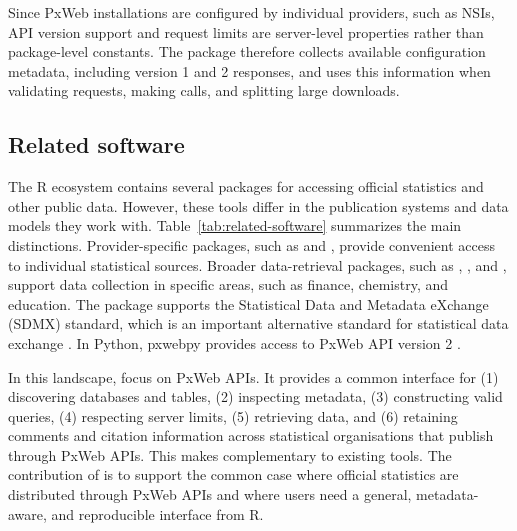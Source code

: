Since PxWeb installations are configured by individual providers, such as NSIs, API version support and request limits are server-level properties rather than package-level constants.
The  package therefore collects available configuration metadata, including version 1 and 2  responses, and uses this information when validating requests, making calls, and splitting large downloads.

\subsection{Related software}
\label{sec:related}

The R ecosystem contains several packages for accessing official statistics and other public data.
However, these tools differ in the publication systems and data models they work with.
Table~\ref{tab:related-software} summarizes the main distinctions.
Provider-specific packages, such as  \citep{Lahti17eurostat} and  \citep{WDI}, provide convenient access to individual statistical sources.
Broader data-retrieval packages, such as  \citep{pdfetch},  \citep{szocs2020webchem}, and  \citep{caro2017intsvy}, support data collection in specific areas, such as finance, chemistry, and education.
The  package supports the Statistical Data and Metadata eXchange (SDMX) standard, which is an important alternative standard for statistical data exchange \citep{rsdmx,willekens2023sdmx}.
In Python, pxwebpy provides access to PxWeb API version 2 \citep{pxwebpy}.

In this landscape,  focus on PxWeb APIs.
It provides a common interface for (1) discovering databases and tables, (2) inspecting metadata, (3) constructing valid queries, (4) respecting server limits, (5) retrieving data, and (6) retaining comments and citation information across statistical organisations that publish through PxWeb APIs.
This makes  complementary to existing tools.
The contribution of  is to support the common case where official statistics are distributed through PxWeb APIs and where users need a general, metadata-aware, and reproducible interface from R.

